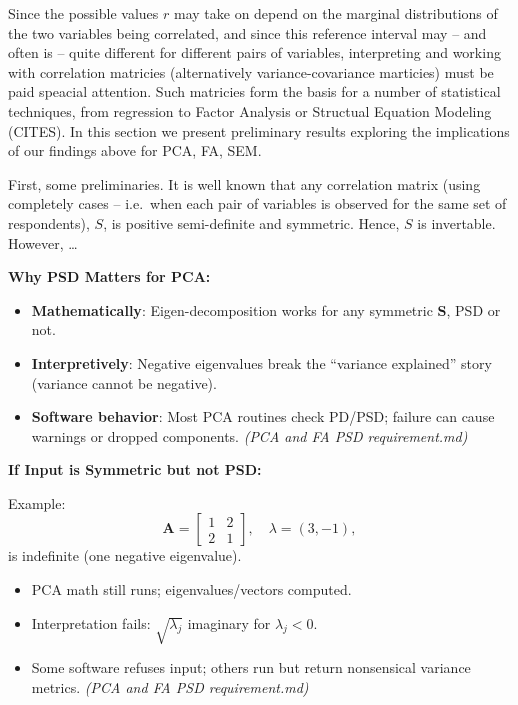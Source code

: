\documentclass[
  12pt,
]{article}
\providecommand{\tightlist}{%
  \setlength{\itemsep}{0pt}\setlength{\parskip}{0pt}}
\theoremstyle{plain}
\theoremstyle{definition}
\theoremstyle{remark}
\begin{document}
Since the possible values \(r\) may take on depend on the marginal
distributions of the two variables being correlated, and since this
reference interval may -- and often is -- quite different for different
pairs of variables, interpreting and working with correlation matricies
(alternatively variance-covariance marticies) must be paid speacial
attention. Such matricies form the basis for a number of statistical
techniques, from regression to Factor Analysis or Structual Equation
Modeling (CITES). In this section we present preliminary results
exploring the implications of our findings above for PCA, FA, SEM.

First, some preliminaries. It is well known that any correlation matrix
(using completely cases -- i.e.~when each pair of variables is observed
for the same set of respondents), \(S\), is positive semi-definite and
symmetric. Hence, \(S\) is invertable. However, \ldots{}

\textbf{Why PSD Matters for PCA:}

\begin{itemize}
\tightlist
\item
  \textbf{Mathematically}: Eigen-decomposition works for any symmetric
  \(\mathbf{S}\), PSD or not.
\item
  \textbf{Interpretively}: Negative eigenvalues break the ``variance
  explained'' story (variance cannot be negative).
\item
  \textbf{Software behavior}: Most PCA routines check PD/PSD; failure
  can cause warnings or dropped components. \emph{(PCA and FA PSD
  requirement.md)}
\end{itemize}

\textbf{If Input is Symmetric but not PSD:}

Example:\\
\[
\mathbf{A} = \begin{bmatrix} 1 & 2 \\ 2 & 1 \end{bmatrix},\quad \lambda = (3,-1),
\] is indefinite (one negative eigenvalue).

\begin{itemize}
\tightlist
\item
  PCA math still runs; eigenvalues/vectors computed.
\item
  Interpretation fails: \(\sqrt{\lambda_j}\) imaginary for
  \(\lambda_j<0\).
\item
  Some software refuses input; others run but return nonsensical
  variance metrics. \emph{(PCA and FA PSD requirement.md)}
\end{itemize}
\end{document}
